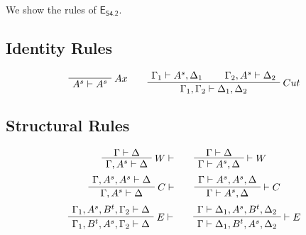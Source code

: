 \documentclass{article}
\newcommand{\seq}[2]{{#1} \vdash{} {#2}}
\newcommand{\pf}[2]{{#1}^{#2}} %
\newcommand{\eseq}{\mathsf{E}_{{\textsf{S4.2}}}}
\theoremstyle{definition}
\begin{document}
We show the rules of $\eseq$. %

\subsection*{Identity Rules}
\[
\AxiomC{}
\RightLabel{$Ax$}
\UnaryInfC{$\seq{\pf{A}{s}}{\pf{A}{s}}$}
\DisplayProof
\qquad
\AxiomC{$\seq{\Gamma_1}{\pf{A}{s}, \Delta_1}$}
\AxiomC{$\seq{\Gamma_2, \pf{A}{s}}{\Delta_2}$}
\RightLabel{$Cut$}
\BinaryInfC{$\seq{\Gamma_1, \Gamma_2}{\Delta_1, \Delta_2}$}
\DisplayProof
\]

\subsection*{Structural Rules}
\[
\AxiomC{$\seq{\Gamma}{\Delta}$}
\RightLabel{$W\vdash$}
\UnaryInfC{$\seq{\Gamma, \pf{A}{s}}{\Delta}$}
\DisplayProof
\qquad
\AxiomC{$\seq{\Gamma}{\Delta}$}
\RightLabel{$\vdash W$}
\UnaryInfC{$\seq{\Gamma}{\pf{A}{s}, \Delta}$}
\DisplayProof
\]
\[
\AxiomC{$\seq{\Gamma, \pf{A}{s}, \pf{A}{s}}{\Delta}$}
\RightLabel{$C\vdash$}
\UnaryInfC{$\seq{\Gamma, \pf{A}{s}}{\Delta}$}
\DisplayProof
\qquad
\AxiomC{$\seq{\Gamma}{\pf{A}{s}, \pf{A}{s}, \Delta}$}
\RightLabel{$\vdash C$}
\UnaryInfC{$\seq{\Gamma}{\pf{A}{s}, \Delta}$}
\DisplayProof
\]
\[
\AxiomC{$\seq{\Gamma_1, \pf{A}{s}, \pf{B}{t}, \Gamma_2}{\Delta}$}
\RightLabel{$E\vdash$}
\UnaryInfC{$\seq{\Gamma_1, \pf{B}{t}, \pf{A}{s}, \Gamma_2}{\Delta}$}
\DisplayProof
\qquad
\AxiomC{$\seq{\Gamma}{\Delta_1, \pf{A}{s}, \pf{B}{t}, \Delta_2}$}
\RightLabel{$\vdash E$}
\UnaryInfC{$\seq{\Gamma}{\Delta_1, \pf{B}{t}, \pf{A}{s}, \Delta_2}$}
\DisplayProof
\]
\end{document}
